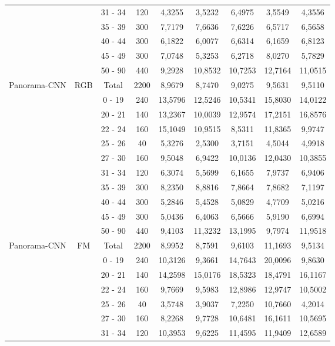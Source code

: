 \begin{table}[ht!]
{\begin{tabular}{|c|c|c|c|c|c|c|c|c|}
 &  & 31 - 34 & 120 & 4,3255 & 3,5232 & 6,4975 & 3,5549 & 4,3556 \\
 &  & 35 - 39 & 300 & 7,7179 & 7,6636 & 7,6226 & 6,5717 & 6,5658 \\
 &  & 40 - 44 & 300 & 6,1822 & 6,0077 & 6,6314 & 6,1659 & 6,8123 \\
 &  & 45 - 49 & 300 & 7,0748 & 5,3253 & 6,2718 & 8,0270 & 5,7829 \\
 &  & 50 - 90 & 440 & 9,2928 & 10,8532 & 10,7253 & 12,7164 & 11,0515 \\ \hline
\multirow{11}{*}{Panorama-CNN} & \multirow{11}{*}{RGB} & Total & 2200 & 8,9679 & 8,7470 & 9,0275 & 9,5631 & 9,5110 \\
 &  & 0 - 19 & 240 & 13,5796 & 12,5246 & 10,5341 & 15,8030 & 14,0122 \\
 &  & 20 - 21 & 140 & 13,2367 & 10,0039 & 12,9574 & 17,2151 & 16,8576 \\
 &  & 22 - 24 & 160 & 15,1049 & 10,9515 & 8,5311 & 11,8365 & 9,9747 \\
 &  & 25 - 26 & 40 & 5,3276 & 2,5300 & 3,7151 & 4,5044 & 4,9918 \\
 &  & 27 - 30 & 160 & 9,5048 & 6,9422 & 10,0136 & 12,0430 & 10,3855 \\
 &  & 31 - 34 & 120 & 6,3074 & 5,5699 & 6,1655 & 7,9737 & 6,9406 \\
 &  & 35 - 39 & 300 & 8,2350 & 8,8816 & 7,8664 & 7,8682 & 7,1197 \\
 &  & 40 - 44 & 300 & 5,2846 & 5,4528 & 5,0829 & 4,7709 & 5,0216 \\
 &  & 45 - 49 & 300 & 5,0436 & 6,4063 & 6,5666 & 5,9190 & 6,6994 \\
 &  & 50 - 90 & 440 & 9,4103 & 11,3232 & 13,1995 & 9,7974 & 11,9518 \\ \hline
\multirow{11}{*}{Panorama-CNN} & \multirow{11}{*}{FM} & Total & 2200 & 8,9952 & 8,7591 & 9,6103 & 11,1693 & 9,5134 \\
 &  & 0 - 19 & 240 & 10,3126 & 9,3661 & 14,7643 & 20,0096 & 9,8630 \\
 &  & 20 - 21 & 140 & 14,2598 & 15,0176 & 18,5323 & 18,4791 & 16,1167 \\
 &  & 22 - 24 & 160 & 9,7669 & 9,5983 & 12,8986 & 12,9747 & 10,5002 \\
 &  & 25 - 26 & 40 & 3,5748 & 3,9037 & 7,2250 & 10,7660 & 4,2014 \\
 &  & 27 - 30 & 160 & 8,2268 & 9,7728 & 10,6481 & 16,1611 & 10,5695 \\
 &  & 31 - 34 & 120 & 10,3953 & 9,6225 & 11,4595 & 11,9409 & 12,6589 \\

\end{tabular}}
\end{table}
